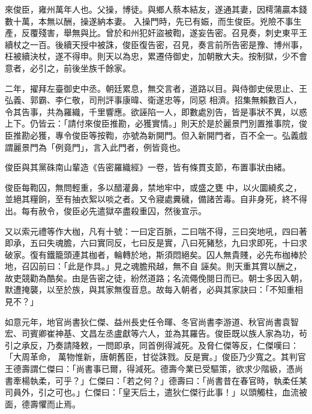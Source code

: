 \begin{pinyinscope}
 來俊臣，雍州萬年人也。父操，博徒。與鄉人蔡本結友，遂通其妻，因樗蒲贏本錢數十萬，本無以酬，操遂納本妻。
 入操門時，先已有娠，而生俊臣。兇險不事生產，反覆殘害，舉無與比。曾於和州犯奸盜被鞫，遂妄告密。召見奏，刺史東平王續杖之一百。後續天授中被誅，俊臣復告密，召見，奏言前所告密是豫、博州事，枉被續決杖，遂不得申。則天以為忠，累遷侍御史，加朝散大夫。按制獄，少不會意者，必引之，前後坐族千餘家。



 二年，擢拜左臺御史中丞。朝廷累息，無交言者，道路以目。與侍御史侯思止、王弘義、郭霸、李仁敬，司刑評事康暐、衛遂忠等，同惡
 相濟。招集無賴數百人，令其告事，共為羅織，千里響應。欲誣陷一人，即數處別告，皆是事狀不異，以惑上下。仍皆云：「請付來俊臣推勘，必獲實情。」則天於是於麗景門別置推事院，俊臣推勘必獲，專令俊臣等按鞫，亦號為新開門。但入新開門者，百不全一。弘義戲謂麗景門為「例竟門」，言入此門者，例皆竟也。



 俊臣與其黨硃南山輩造《告密羅織經》一卷，皆有條貫支節，布置事狀由緒。



 俊臣每鞫囚，無問輕重，多以醋灌鼻，禁地牢中，或盛之甕
 中，以火圜繞炙之，並絕其糧餉，至有抽衣絮以啖之者。又令寢處糞穢，備諸苦毒。自非身死，終不得出。每有赦令，俊臣必先遣獄卒盡殺重囚，然後宣示。



 又以索元禮等作大枷，凡有十號：一曰定百脈，二曰喘不得，三曰突地吼，四曰著即承，五曰失魂膽，六曰實同反，七曰反是實，八曰死豬愁，九曰求即死，十曰求破家。復有鐵籠頭連其枷者，輪轉於地，斯須悶絕矣。囚人無貴賤，必先布枷棒於地，召囚前曰：「此是作具。」見之魂膽飛越，無不自
 誣矣。則天重其賞以酬之，故吏競勸為酷矣。由是告密之徒，紛然道路；名流僶俛閱日而已。朝士多因入朝，默遭掩襲，以至於族，與其家無復音息。故每入朝者，必與其家訣曰：「不知重相見不？」



 如意元年，地官尚書狄仁傑、益州長史任令暉、冬官尚書李游道、秋官尚書袁智宏、司賓卿崔神基、文昌左丞盧獻等六人，並為其羅告。俊臣既以族人家為功，茍引之承反，乃奏請降敕，一問即承，同首例得減死。及脅仁傑等反，仁傑嘆曰：「大周革命，
 萬物惟新，唐朝舊臣，甘從誅戮。反是實。」俊臣乃少寬之。其判官王德壽謂仁傑曰：「尚書事已爾，得減死。德壽今業已受驅策，欲求少階級，憑尚書牽楊執柔，可乎？」仁傑曰：「若之何？」德壽曰：「尚書昔在春官時，執柔任某司員外，引之可也。」仁傑曰：「皇天后土，遣狄仁傑行此事！」以頭觸柱，血流被面，德壽懼而止焉。




\end{pinyinscope}
